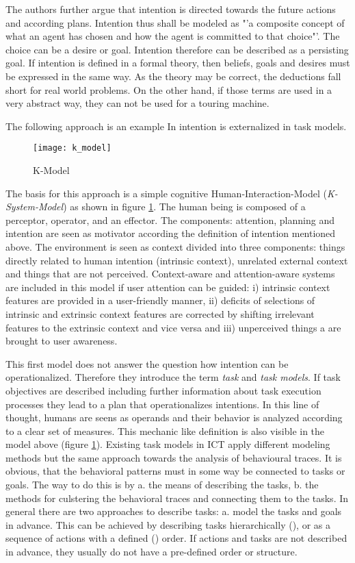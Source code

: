 The authors further argue that intention is directed towards the future actions and according plans. Intention thus shall be modeled as "'a composite concept of what an agent has chosen and how the agent is committed to that choice"'. The choice can be a desire or goal. Intention therefore can be described as a persisting goal. If intention is defined in a formal theory, then beliefs, goals and desires must be expressed in the same way. As the theory may be correct, the deductions fall short for real world problems. On the other hand, if those terms are used in a very abstract way, they can not be used for a touring machine. 

The following approach is an example In \cite{schmidt2011task} intention is externalized in task models. 

\begin{figure}[ht]
	\centering
  \texttt{[image: k\_model]}
	\caption{K-Model}
	\label{fig1}
\end{figure}

The basis for this approach is a simple cognitive Human-Interaction-Model (\textit{K-System-Model}) as shown in figure \ref{fig1}. The human being is composed of a perceptor, operator, and an effector. The components: attention, planning and intention are seen as motivator according the definition of intention mentioned above. The environment is seen as context divided into three components: things directly related to human intention (intrinsic context), unrelated external context and things that are not perceived. Context-aware and attention-aware systems are included in this model if user attention can be guided: i) intrinsic context features are provided in a user-friendly manner, ii) deficits of selections of intrinsic and extrinsic context features are corrected by shifting irrelevant features to the extrinsic context and vice versa and iii) unperceived things a are brought to user awareness. 

This first model does not answer the question how intention can be operationalized. Therefore they introduce the term \textit{task} and \textit{task models}. If task objectives are described including further information about task execution processes they lead to a plan that operationalizes intentions.  In this line of thought, humans are seens as operands and their behavior is analyzed according to a clear set of measures. This mechanic like definition is also visible in the model above (figure \ref{fig1}). Existing task models in \ac{ICT} apply different modeling methods but the same approach towards the analysis of behavioural traces. It is obvious, that the behavioral patterns must in some way be connected to tasks or goals. The way to do this is by a. the means of describing the tasks, b. the methods for culstering the behavioral traces and connecting them to the tasks. In general there are two approaches to describe tasks: a. model the tasks and goals in advance. This can be achieved by describing tasks hierarchically (\cite{newell1972human}), or as a sequence of actions with a defined (\cite{eder1995workflow}) order. If actions and tasks are not described in advance, they usually do not have a pre-defined order or structure. 

